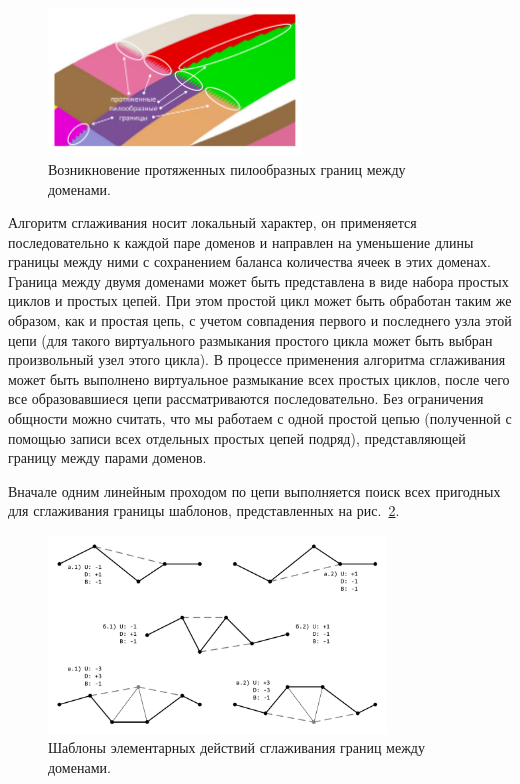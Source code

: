 \documentclass[a4paper,14pt]{extarticle}                     %
\theoremstyle{plain}                                         %
\begin{document}
\begin{figure}[ht]
\centering
\includegraphics[width=0.6\textwidth]{./pics/text_2_smooth/bad-border.pdf}
\singlespacing
{}\caption{Возникновение протяженных пилообразных границ между доменами.}
\label{fig:text_2_smooth_bad_border}
\end{figure}

Алгоритм сглаживания носит локальный характер, он применяется последовательно к каждой паре доменов и направлен на уменьшение длины границы между ними с сохранением баланса количества ячеек в этих доменах.
Граница между двумя доменами может быть представлена в виде набора простых циклов и простых цепей.
При этом простой цикл может быть обработан таким же образом, как и простая цепь, с учетом совпадения первого и последнего узла этой цепи (для такого виртуального размыкания простого цикла может быть выбран произвольный узел этого цикла).
В процессе применения алгоритма сглаживания может быть выполнено виртуальное размыкание всех простых циклов, после чего все образовавшиеся цепи рассматриваются последовательно.
Без ограничения общности можно считать, что мы работаем с одной простой цепью (полученной с помощью записи всех отдельных простых цепей подряд), представляющей границу между парами доменов.

Вначале одним линейным проходом по цепи выполняется поиск всех пригодных для сглаживания границы шаблонов, представленных на рис.~\ref{fig:text_2_smooth_smooth_border}.

\begin{figure}[ht]
\centering
\includegraphics[width=0.8\textwidth]{./pics/text_2_smooth/smooth-border.pdf}
\singlespacing
{}\caption{Шаблоны элементарных действий сглаживания границ между доменами.}
\label{fig:text_2_smooth_smooth_border}
\end{figure}
\end{document}

